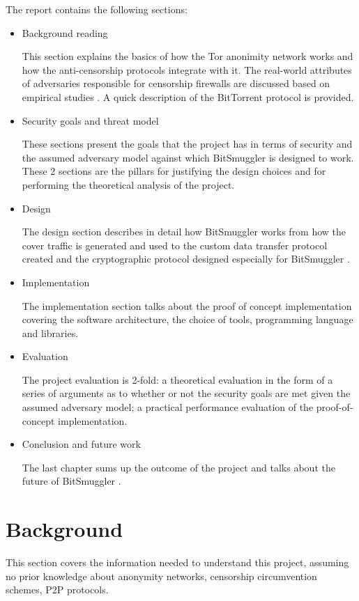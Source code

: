 \documentclass[11pt]{book} %
\newcommand{\projectName}{BitSmuggler }
\begin{document}
The report contains the following sections:
\begin{itemize}
\item Background reading

This section explains the basics of how the Tor anonimity network works and how the anti-censorship protocols integrate with it. The real-world attributes of adversaries responsible for censorship firewalls are discussed based on empirical studies . A quick description of the BitTorrent protocol is provided.
\item Security goals and threat model

These sections present the goals that the project has in terms of security and the assumed adversary model against which \projectName is designed to work. These 2 sections are the pillars for justifying the design choices and for performing the theoretical analysis of the project.
\item Design

The design section describes in detail how \projectName works from how the cover traffic is generated and used to the custom data transfer protocol created and the cryptographic protocol designed especially for \projectName.

\item Implementation

The implementation section talks about the proof of concept implementation covering the software architecture, the choice of tools, programming language and libraries.
\item Evaluation

The project evaluation is 2-fold: a theoretical evaluation in the form of a series of arguments as to whether or not the security goals are met given the assumed adversary model; a practical performance evaluation of the proof-of-concept implementation.

\item Conclusion and future work

The last chapter sums up the outcome of the project and talks about the future of \projectName.
\end{itemize}



\chapter{Background}


This section covers the information needed to understand this project, assuming no prior knowledge about anonymity networks, censorship circumvention schemes, P2P protocols.
\end{document}
